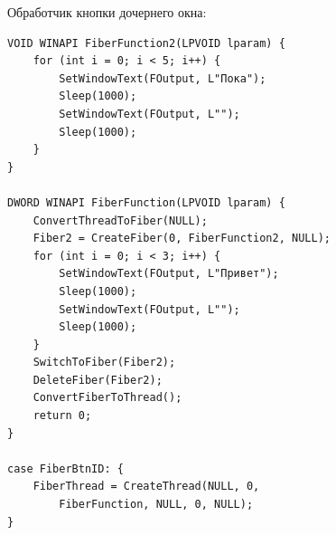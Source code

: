 \documentclass[12pt]{article}
\begin{document}
Обработчик кнопки дочернего окна:\\
\begin{verbatim}
VOID WINAPI FiberFunction2(LPVOID lparam) {
    for (int i = 0; i < 5; i++) {
        SetWindowText(FOutput, L"Пока");
        Sleep(1000);
        SetWindowText(FOutput, L"");
        Sleep(1000);
    }
}

DWORD WINAPI FiberFunction(LPVOID lparam) {
    ConvertThreadToFiber(NULL);
    Fiber2 = CreateFiber(0, FiberFunction2, NULL);
    for (int i = 0; i < 3; i++) {
        SetWindowText(FOutput, L"Привет");
        Sleep(1000);
        SetWindowText(FOutput, L"");
        Sleep(1000);
    }
    SwitchToFiber(Fiber2);
    DeleteFiber(Fiber2);
    ConvertFiberToThread();
    return 0;
}

case FiberBtnID: {
    FiberThread = CreateThread(NULL, 0,
        FiberFunction, NULL, 0, NULL); 
}
\end{verbatim}
\end{document}
